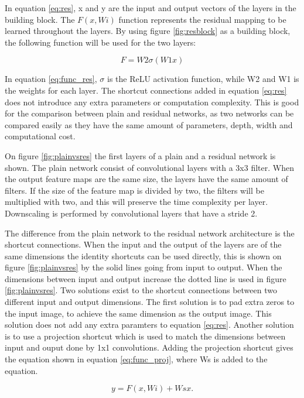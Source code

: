 In equation \ref{eq:res}, x and y are the input and output vectors of the layers in the building block. The $F(x,{Wi})$ function represents the residual mapping to be learned throughout the layers. By using figure \ref{fig:resblock} as a building block, the following function will be used for the two layers: 

\begin{equation} \label{eq:func_res}
F = W2\sigma(W1x)
\end{equation} 

In equation \ref{eq:func_res}, $\sigma$ is the ReLU activation function, while W2 and W1 is the weights for each layer. The shortcut connections added in equation \ref{eq:res} does not introduce any extra parameters or computation complexity. This is good for the comparison between plain and residual networks, as two networks can be compared easily as they have the same amount of parameters, depth, width and computational cost.
\newline

On figure \ref{fig:plainvsres} the first layers of a plain and a residual network is shown. The plain network consist of convolutional layers with a 3x3 filter. When the output feature maps are the same size, the layers have the same amount of filters. If the size of the feature map is divided by two, the filters will be multiplied with two, and this will preserve the time complexity per layer. Downscaling is performed by convolutional layers that have a stride 2.

\FloatBarrier

The difference from the plain network to the residual network architecture is the shortcut connections. When the input and the output of the layers are of the same dimensions the identity shortcuts can be used directly, this is shown on figure \ref{fig:plainvsres} by the solid lines going from input to output. When the dimensions between input and output increase the dotted line is used in figure \ref{fig:plainvsres}. Two solutions exist to the shortcut connections between two different input and output dimensions. The first solution is to pad extra zeros to the input image, to achieve the same dimension as the output image. This solution does not add any extra paramters to equation \ref{eq:res}. Another solution is to use a projection shortcut which is used to match the dimensions between input and ouput done by 1x1 convolutions. Adding the projection shortcut gives the equation shown in equation \ref{eq:func_proj}, where Ws is added to the equation.

\begin{equation} \label{eq:func_proj}
y = F(x, {Wi}) + Wsx.
\end{equation} 